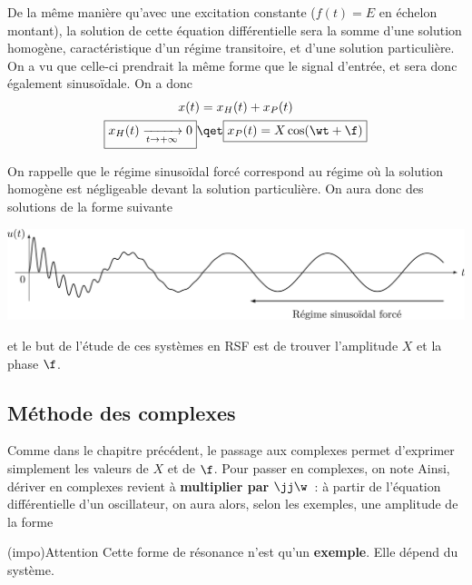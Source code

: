 \documentclass[../../main/main.tex]{subfiles}
\begin{document}
De la même manière qu'avec une excitation constante ($f(t) = E$ en échelon
montant), la solution de cette équation différentielle sera la somme d'une
solution homogène, caractéristique d'un régime transitoire, et d'une solution
particulière. On a vu que celle-ci prendrait la même forme que le signal
d'entrée, et sera donc également sinusoïdale. On a donc
\begin{gather*}
	x(t) = x_H(t) + x_P(t)\\
	\boxed{x_H(t) \xrightarrow[t\to+\infty]{} 0}
	\qet
	\boxed{x_P(t) = X\cos(\wt+\f)}
\end{gather*}

On rappelle que le régime sinusoïdal forcé correspond au régime où la solution
homogène est négligeable devant la solution particulière. On aura donc des
solutions de la forme suivante
\begin{center}
	\includegraphics[width=\linewidth]{rsf_intro}
\end{center}
et le but de l'étude de ces systèmes en RSF est de trouver l'amplitude $X$ et la
phase $\f$.

\vspace{-10pt}
\subsection{Méthode des complexes}
Comme dans le chapitre précédent, le passage aux complexes permet d'exprimer
simplement les valeurs de $X$ et de $\f$. Pour passer en complexes, on note
Ainsi, dériver en complexes revient à \textbf{multiplier par $\jj\w$}~: à partir
de l'équation différentielle d'un oscillateur, on aura alors, selon les
exemples, une amplitude de la forme
\psw{
	\[
		\boxed{
			\xul{X}
			= \frac{A_0}{1 + \jj Q \left( \frac{\w}{\w_r} - \frac{\w_r}{\w} \right)}
		}\]
}
\vspace{-15pt}

\begin{tcb}[cnt](impo){Attention}
	Cette forme de résonance n'est qu'un \textbf{exemple}. Elle dépend du
	système.
\end{tcb}
\end{document}
